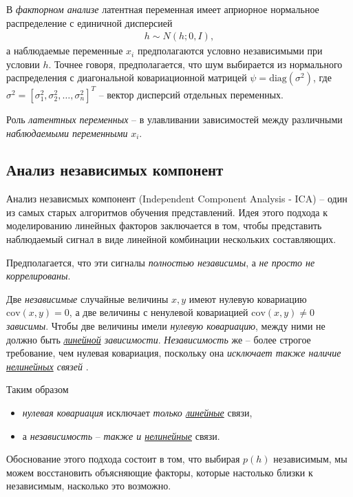 \documentclass[%
	11pt,
	a4paper,
	utf8,
]{article}
\begin{document}
В \emph{факторном анализе} латентная переменная имеет априорное нормальное распределение с единичной дисперсией
\begin{align*}
	h \sim N(h; 0, I),
\end{align*}
а наблюдаемые переменные $ x_i $ предполагаются условно независимыми при условии $ h $. Точнее говоря, предполагается, что шум выбирается из нормального распределения с диагональной ковариационной матрицей $ \psi = \text{diag} (\sigma^2) $, где $ \sigma^2 = [\sigma_1^2, \sigma_2^2, \ldots, \sigma_n^2]^T $ -- вектор дисперсий отдельных переменных.

Роль \emph{латентных переменных} -- в улавливании зависимостей между различными \emph{наблюдаемыми переменными} $ x_i $.

\subsection{Анализ независимых компонент}

Анализ независмых компонент (Independent Component Analysis - ICA) -- один из самых старых алгоритмов обучения представлений. Идея этого подхода к моделированию линейных факторов заключается в том, чтобы представить наблюдаемый сигнал в виде линейной комбинации нескольких составляющих.

Предполагается, что эти сигналы \emph{полностью независимы}, а \emph{не просто не коррелированы}.

Две \emph{независимые} случайные величины $ x, y $ имеют нулевую ковариацию $ \text{cov}(x, y) = 0 $, а две величины с ненулевой ковариацией $ \text{cov}(x, y) \neq 0 $ \emph{зависимы}. {\color{blue}Чтобы две величины имели \emph{нулевую ковариацию}, между ними не должно быть \emph{\underline{линейной} зависимости}. \emph{Независимость} же -- более строгое требование, чем нулевая ковариация, поскольку она \emph{исключает также наличие \underline{нелинейных} связей}} \cite[]{goodfellow:ml-2018}.

Таким образом
\begin{itemize}
	\item \emph{нулевая ковариация} исключает \emph{только \underline{линейные}} связи,
	
	\item а \emph{независимость} -- \emph{также и \underline{нелинейные}} связи.
\end{itemize}

Обоснование этого подхода состоит в том, что выбирая $ p(h) $ независимым, мы можем восстановить объясняющие факторы, которые настолько близки к независимым, насколько это возможно.
\end{document}
